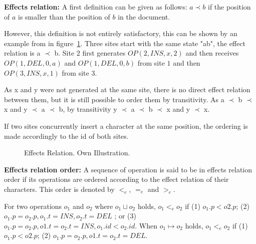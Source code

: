 \documentclass[11pt, a4paper, oneside, openright]{article} %
\begin{document}
\textbf{Effects relation:} A first definition can be given as follows: $a \prec b$ if the position of $a$ is smaller than the position of $b$ in the document.

However, this definition is not entirely satisfactory, this can be shown by an example from \cite{abtuu} in figure~\ref{fig:effectrel}. Three sites start with the same state "ab", the effect relation is a $\prec$ b. Site $2$ first generates $OP(2, INS, x, 2)$ and then receives $OP(1, DEL, 0, a)$ and $OP(1, DEL, 0, b)$ from site $1$ and then $OP(3, INS, x, 1)$ from site $3$.

As x and y were not generated at the same site, there is no direct effect relation between them, but it is still possible to order them by transitivity. As a $\prec$ b $\prec$ x and y $\prec$ a $\prec$ b, by transitivity y $\prec$ a $\prec$ b $\prec$ x and y $\prec$ x.

If two sites concurrently insert a character at the same position, the ordering is made accordingly to the id of both sites.

\begin{figure}[h]
\begin{center}
\end{center}
\caption{Effects Relation. Own Illustration.\label{fig:effectrel}}
\end{figure}

\textbf{Effects relation order:} A sequence of operation is said to be in effects relation order if its operations are ordered according to the effect relation of their characters. This order is denoted by $<_e$,  $=_e$ and $>_e$.

For two operations $o_1$ and $o_2$ where $o_1 \sqcup o_2$ holds, $o_1 <_e o_2$ if (1) $o_1.p < o2.p$; (2) $ o_1.p = o_2.p, o_1.t = INS, o_2.t = DEL$ ; or (3) $o_1.p = o_2.p, o1.t = o_2.t = INS, o_1.id < o_2.id$. When $o_1 \mapsto o_2$ holds, $o_1 <_e o_2$ if (1) $o_1.p < o2.p$; (2) $o_1.p = o_2.p, o1.t = o_2.t = DEL$.
\end{document}
